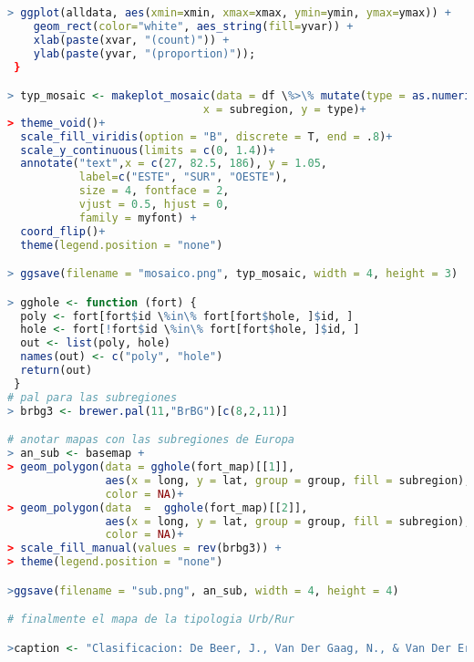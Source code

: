 \begin{lstlisting}[language=R, caption=C\'odigo R para la elaboraci\'on de la clasificaci\'on urbana/rural regiones NUTS-2 correspondiente a la figura 1.3]
> ggplot(alldata, aes(xmin=xmin, xmax=xmax, ymin=ymin, ymax=ymax)) + 
    geom_rect(color="white", aes_string(fill=yvar)) +
    xlab(paste(xvar, "(count)")) + 
    ylab(paste(yvar, "(proportion)"));
 }

> typ_mosaic <- makeplot_mosaic(data = df \%>\% mutate(type = as.numeric(type)), 
                              x = subregion, y = type)+
> theme_void()+
  scale_fill_viridis(option = "B", discrete = T, end = .8)+
  scale_y_continuous(limits = c(0, 1.4))+
  annotate("text",x = c(27, 82.5, 186), y = 1.05, 
           label=c("ESTE", "SUR", "OESTE"), 
           size = 4, fontface = 2, 
           vjust = 0.5, hjust = 0,
           family = myfont) + 
  coord_flip()+
  theme(legend.position = "none")

> ggsave(filename = "mosaico.png", typ_mosaic, width = 4, height = 3)

> gghole <- function (fort) {
  poly <- fort[fort$id \%in\% fort[fort$hole, ]$id, ]
  hole <- fort[!fort$id \%in\% fort[fort$hole, ]$id, ]
  out <- list(poly, hole)
  names(out) <- c("poly", "hole")
  return(out)
 }
# pal para las subregiones
> brbg3 <- brewer.pal(11,"BrBG")[c(8,2,11)]

# anotar mapas con las subregiones de Europa
> an_sub <- basemap +
> geom_polygon(data = gghole(fort_map)[[1]], 
               aes(x = long, y = lat, group = group, fill = subregion),
               color = NA)+
> geom_polygon(data  =  gghole(fort_map)[[2]], 
               aes(x = long, y = lat, group = group, fill = subregion),
               color = NA)+
> scale_fill_manual(values = rev(brbg3)) +
> theme(legend.position = "none")

>ggsave(filename = "sub.png", an_sub, width = 4, height = 4)

# finalmente el mapa de la tipologia Urb/Rur

>caption <- "Clasificacion: De Beer, J., Van Der Gaag, N., & Van Der Erf, R. (2014).\n Nueva clasificacion de las regiones urbanas y rurales en Europa NUTS-2. NIDI Working Papers, 2014/3.\n Extraido de http://www.nidi.nl/shared/content/output/papers/nidi-wp-2014-03.pdf\n Hecho con R - \copyright Jose R. Caro Barrera a partir de I. Kashnitsky"


\end{lstlisting}
